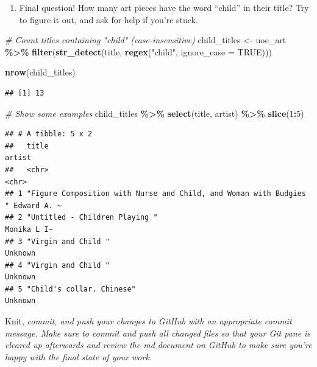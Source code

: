 \documentclass[
]{article}
\newenvironment{Shaded}{\begin{snugshade}}{\end{snugshade}}
\newcommand{\AttributeTok}[1]{\textcolor[rgb]{0.13,0.29,0.53}{#1}}
\newcommand{\CommentTok}[1]{\textcolor[rgb]{0.56,0.35,0.01}{\textit{#1}}}
\newcommand{\ConstantTok}[1]{\textcolor[rgb]{0.56,0.35,0.01}{#1}}
\newcommand{\DecValTok}[1]{\textcolor[rgb]{0.00,0.00,0.81}{#1}}
\newcommand{\FunctionTok}[1]{\textcolor[rgb]{0.13,0.29,0.53}{\textbf{#1}}}
\newcommand{\NormalTok}[1]{#1}
\newcommand{\OtherTok}[1]{\textcolor[rgb]{0.56,0.35,0.01}{#1}}
\newcommand{\SpecialCharTok}[1]{\textcolor[rgb]{0.81,0.36,0.00}{\textbf{#1}}}
\newcommand{\StringTok}[1]{\textcolor[rgb]{0.31,0.60,0.02}{#1}}
\providecommand{\tightlist}{%
  \setlength{\itemsep}{0pt}\setlength{\parskip}{0pt}}
\begin{document}
\begin{enumerate}
\def\labelenumi{\arabic{enumi}.}
\setcounter{enumi}{13}
\tightlist
\item
  Final question! How many art pieces have the word ``child'' in their
  title? Try to figure it out, and ask for help if you're stuck.
\end{enumerate}

\begin{Shaded}
\begin{Highlighting}[]
\CommentTok{\# Count titles containing "child" (case{-}insensitive)}
\NormalTok{child\_titles }\OtherTok{\textless{}{-}}\NormalTok{ uoe\_art }\SpecialCharTok{\%\textgreater{}\%}
  \FunctionTok{filter}\NormalTok{(}\FunctionTok{str\_detect}\NormalTok{(title, }\FunctionTok{regex}\NormalTok{(}\StringTok{"child"}\NormalTok{, }\AttributeTok{ignore\_case =} \ConstantTok{TRUE}\NormalTok{)))}

\FunctionTok{nrow}\NormalTok{(child\_titles)}
\end{Highlighting}
\end{Shaded}

\begin{verbatim}
## [1] 13
\end{verbatim}

\begin{Shaded}
\begin{Highlighting}[]
\CommentTok{\# Show some examples}
\NormalTok{child\_titles }\SpecialCharTok{\%\textgreater{}\%}
  \FunctionTok{select}\NormalTok{(title, artist) }\SpecialCharTok{\%\textgreater{}\%}
  \FunctionTok{slice}\NormalTok{(}\DecValTok{1}\SpecialCharTok{:}\DecValTok{5}\NormalTok{)}
\end{Highlighting}
\end{Shaded}

\begin{verbatim}
## # A tibble: 5 x 2
##   title                                                              artist     
##   <chr>                                                              <chr>      
## 1 "Figure Composition with Nurse and Child, and Woman with Budgies " Edward A. ~
## 2 "Untitled - Children Playing "                                     Monika L I~
## 3 "Virgin and Child "                                                Unknown    
## 4 "Virgin and Child "                                                Unknown    
## 5 "Child's collar. Chinese"                                          Unknown
\end{verbatim}

Knit, \emph{commit, and push your changes to GitHub with an appropriate
commit message. Make sure to commit and push all changed files so that
your Git pane is cleared up afterwards and review the md document on
GitHub to make sure you're happy with the final state of your work.}
\end{document}
